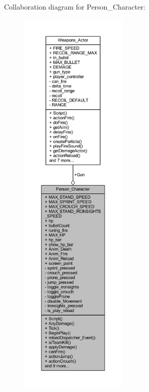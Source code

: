 Collaboration diagram for Person\+\_\+\+Character\+:\nopagebreak
\begin{figure}[H]
\begin{center}
\leavevmode
\includegraphics[height=550pt]{class_person___character__coll__graph}
\end{center}
\end{figure}
